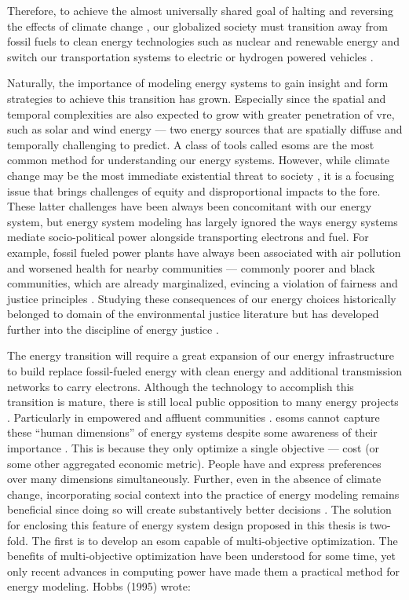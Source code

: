 Therefore, to achieve the almost universally shared goal of halting and
reversing the effects of climate change \cite{united_nations_paris_2015}, our
globalized society must transition away from fossil fuels to clean energy
technologies such as nuclear and renewable energy and switch our transportation
systems to electric or hydrogen powered vehicles
\cite{intergovernmental_panel_on_climate_change_climate_2021}. 

Naturally, the importance of modeling energy systems to gain insight and form
strategies to achieve this transition has grown. Especially since the spatial
and temporal complexities are also expected to grow with greater penetration of
\ac{vre}, such as solar and wind energy --- two energy sources that are
spatially diffuse and temporally challenging to predict. A class of tools called
\acp{esom} are the most common method for understanding our energy systems.
However, while climate change may be the most immediate existential threat to
society \cite{hickman_climate_2021}, it is a focusing issue that brings
challenges of equity and disproportional impacts to the fore. These latter
challenges have been always been concomitant with our energy system, but energy
system modeling has largely ignored the ways energy systems mediate
socio-political power alongside transporting electrons and fuel. For example,
fossil fueled power plants have always been associated with air pollution and
worsened health for nearby communities --- commonly poorer and black
communities, which are already marginalized, evincing a violation of fairness
and justice principles \cite{mohai_which_2015}. Studying these consequences of
our energy choices historically belonged to domain of the environmental justice
literature \cite{schlosberg_reconceiving_2004,mohai_environmental_2009} but has
developed further into the discipline of energy justice
\cite{sovacool_energy_2015}. 

The energy transition will require a great expansion of our energy
infrastructure to build replace fossil-fueled energy with clean energy and
additional transmission networks to carry electrons. Although the technology to
accomplish this transition is mature, there is still local public opposition to
many energy projects \cite{wolsink_wind_2007}. Particularly in empowered and
affluent communities \cite{stokes_prevalence_2023}. \acp{esom} cannot capture
these ``human dimensions'' of energy systems despite some awareness of their
importance \cite{pfenninger_energy_2014}. This is because they only optimize a
single objective --- cost (or some other aggregated economic metric). People
have and express preferences over many dimensions simultaneously. Further, even
in the absence of climate change, incorporating social context into the practice
of energy modeling remains beneficial since doing so will create substantively
better decisions \cite{wilsdon_see-through_2004}. The solution for enclosing
this feature of energy system design proposed in this thesis is two-fold. The
first is to develop an \ac{esom} capable of multi-objective optimization. The
benefits of multi-objective optimization have been understood for some time, yet
only recent advances in computing power have made them a practical method for
energy modeling. Hobbs (1995) wrote:

